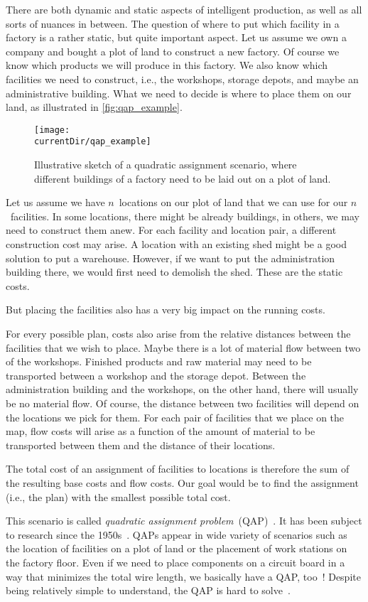 %
%
There are both dynamic and static aspects of intelligent production, as well as all sorts of nuances in between.
The question of where to put which facility in a factory is a rather static, but quite important aspect.
Let us assume we own a company and bought a plot of land to construct a new factory.
Of course we know which products we will produce in this factory.
We also know which facilities we need to construct, i.e., the workshops, storage depots, and maybe an administrative building.
What we need to decide is where to place them on our land, as illustrated in \autoref{fig:qap_example}.%
%
\begin{figure}%
\centering%
\texttt{[image: \\currentDir/qap\_example]}%
\caption{Illustrative sketch of a quadratic assignment scenario, where different buildings of a factory need to be laid out on a plot of land.}%
\label{fig:qap_example}%
\end{figure}%

Let us assume we have $n$~locations on our plot of land that we can use for our $n$~facilities.
In some locations, there might be already buildings, in others, we may need to construct them anew.
For each facility and location pair, a different construction cost may arise.
A location with an existing shed might be a good solution to put a warehouse.
However, if we want to put the administration building there, we would first need to demolish the shed.
These are the static costs.

But placing the facilities also has a very big impact on the running costs.

For every possible plan, costs also arise from the relative distances between the facilities that we wish to place.
Maybe there is a lot of material flow between two of the workshops.
Finished products and raw material may need to be transported between a workshop and the storage depot.
Between the administration building and the workshops, on the other hand, there will usually be no material flow.
Of course, the distance between two facilities will depend on the locations we pick for them.
For each pair of facilities that we place on the map, flow costs will arise as a function of the amount of material to be transported between them and the distance of their locations.

The total cost of an assignment of facilities to locations is therefore the sum of the resulting base costs and flow costs.
Our goal would be to find the assignment (i.e., the plan) with the smallest possible total cost.

This scenario is called \emph{quadratic assignment problem}~(QAP)~\cite{BCPP1998TQAP}.
It has been subject to research since the 1950s~\cite{BK1957APATLOEA}.
QAPs appear in wide variety of scenarios such as the location of facilities on a plot of land or the placement of work stations on the factory floor.
Even if we need to place components on a circuit board in a way that minimizes the total wire length, we basically have a QAP, too~\cite{S1961TBWPAPA}!
Despite being relatively simple to understand, the QAP is hard to solve~\cite{SGA1976PCAP}.
%
\endhsection%
%
